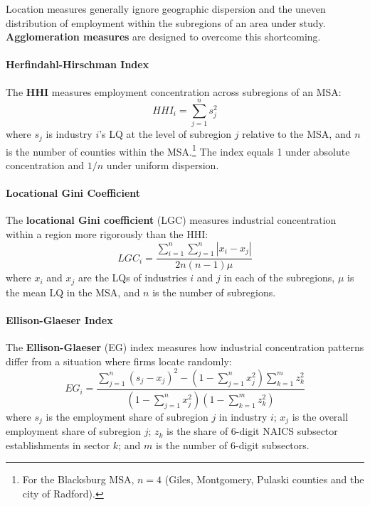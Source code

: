 Location measures generally ignore geographic dispersion and the uneven
distribution of employment within the subregions of an area under study.
\textbf{Agglomeration measures} are designed to overcome
this shortcoming.

\paragraph{Herfindahl-Hirschman Index}

The \textbf{HHI} measures employment concentration across subregions of an
MSA:
\begin{equation}
  HHI_i = \sum_{j=1}^{n} s_j^2
\end{equation}
where $s_j$ is industry $i$'s LQ at the level of subregion $j$ relative to
the MSA, and $n$ is the number of counties within the MSA.\footnote{For the
Blacksburg MSA, $n=4$ (Giles, Montgomery, Pulaski counties and the city of
Radford).} The index equals 1 under absolute concentration and $1/n$ under
uniform dispersion.

\paragraph{Locational Gini Coefficient}

The \textbf{locational Gini coefficient} (LGC) measures industrial
concentration within a region more rigorously than the HHI:
\begin{equation}
  LGC_i = \frac{\sum_{i=1}^{n}\sum_{j=1}^{n}|x_i - x_j|}{2n(n-1)\mu}
\end{equation}
where $x_i$ and $x_j$ are the LQs of industries $i$ and $j$ in each of the
subregions, $\mu$ is the mean LQ in the MSA, and $n$ is the number of
subregions.

\paragraph{Ellison-Glaeser Index}

The \textbf{Ellison-Glaeser} (EG) index \citep{Ellison1997} measures how
industrial concentration patterns differ from a situation where firms locate
randomly:
\begin{equation}
  EG_i = \frac{\displaystyle\sum_{j=1}^{n}(s_j - x_j)^2
               - (1-\sum_{j=1}^{n}x_j^2)\sum_{k=1}^{m}z_k^2}
              {\displaystyle(1-\sum_{j=1}^{n}x_j^2)(1-\sum_{k=1}^{m}z_k^2)}
\end{equation}
where $s_j$ is the employment share of subregion $j$ in industry $i$;
$x_j$ is the overall employment share of subregion $j$; $z_k$ is the share
of 6-digit NAICS subsector establishments in sector $k$; and $m$ is the
number of 6-digit subsectors.

